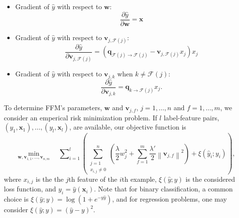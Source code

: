 \documentclass[11pt]{article}
\newcommand{\bsym}[1]{\ensuremath{\boldsymbol{#1}}}
\newcommand{\bw}{\ensuremath{\bsym{w}}}
\newcommand{\bv}{\ensuremath{\bsym{v}}}
\newcommand{\bx}{\ensuremath{\bsym{x}}}
\newcommand{\bq}{\ensuremath{\bsym{q}}}
\newcommand{\field}{\ensuremath{\mathcal F}}
\newcommand{\norm}[1]{\ensuremath{\left\| #1 \right\|}}
\begin{document}
\begin{itemize}
    \item Gradient of $\hat{y}$ with respect to $\bw$: 
        \begin{equation}
            \frac{\partial \hat{y}}{\partial \bw} = \bx
            \label{eq:LinGrad}
        \end{equation}
    \item Gradient of $\hat{y}$ with respect to $\bv_{j, \field(j)}$:
        \begin{equation}
            \frac{\partial \hat{y}}{\partial \bv_{j, \field(j)}} = (\bq_{\field(j) \rightarrow \field(j)} - \bv_{j, \field(j)}x_j) x_j
            \label{eq:IntraGrad}
        \end{equation}
    \item Gradient of $\hat{y}$ with respect to $\bv_{j, k}$ when $k \ne \field(j)$:
        \begin{equation}
            \frac{\partial \hat{y}}{\partial \bv_{j, k}} = \bq_{k\rightarrow \field(j)} x_j.
            \label{eq:InterGrad}
        \end{equation}
\end{itemize}
To determine FFM's parameters, $\bw$ and $\bv_{j, f}$, $j=1,\dots,n$ and $f=1,\dots,m$, we consider an emperical risk minimization problem.
If $l$ label-feature pairs, $(y_1,\bx_1),\dots,(y_l,\bx_l)$, are available, our objective function is
\begin{equation}
    \min_{\bw, \bv_{1, 1},\dots,\bv_{n, m}} \quad  \mathcal \sum_{i=1}^l \left( \sum_{\substack{j=1 \\ x_{i,j} \ne 0}}^n \left(\frac{\lambda}{2} w_j^2 + \sum_{f=1}^m \frac{\lambda'}{2} \norm{\bv_{j,f}}^2\right) + \xi(\hat{y}_i; y_i) \right),
    \label{eq:Prob}
\end{equation}
where $x_{i,j}$ is the the $j$th feature of the $i$th example, $\xi(\hat{y};y)$ is the considered loss function, and $\hat{y}_i=\hat{y}(\bx_i)$.
Note that for binary classification, a common choice is $\xi(\hat{y};y) = \log(1+e^{-y\hat{y}})$, and for regression problems, one may consider $\xi(\hat{y};y) = (\hat{y}-y)^2$.
\end{document}
